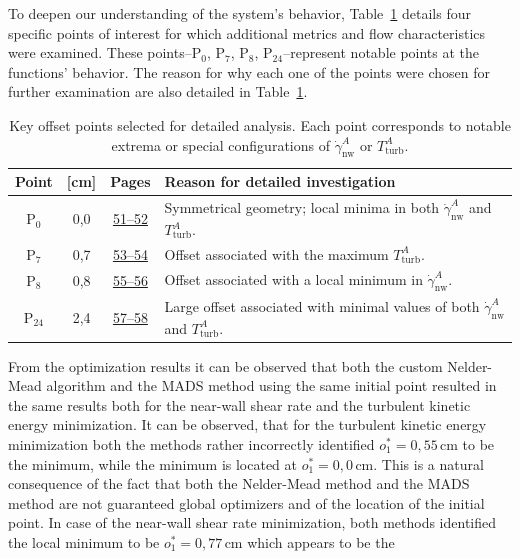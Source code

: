 To deepen our understanding of the system’s behavior, Table~\ref{tab:studied points} details four specific points of interest for which additional metrics and flow characteristics were examined. These points--P$_0$, P$_7$, P$_8$, P$_24$--represent notable points at the functions' behavior. The reason for why each one of the points were chosen for further examination are also detailed in Table~\ref{tab:studied points}.
\vspace{7mm}
\begin{table}[H]
	\bgroup
	\centering
	\setlength\tabcolsep{3mm}
	\def\arraystretch{2.2}%
	\begin{tabular}{|c|c|c|p{8cm}|}
		\hline
		\textbf{Point} & \boldmath{$o_1$} \textbf{[cm]} & \textbf{Pages} & \textbf{Reason for detailed investigation} \\ \hline
		P$_0$ & 0{,}0 & \hyperlink{page.51}{51--52} & Symmetrical geometry; local minima in both $\dot{\gamma}^{A}_{\mathrm{nw}}$ and $T^{A}_{\mathrm{turb}}$. \\ \hline
		P$_7$ & 0{,}7 & \hyperlink{page.53}{53--54} & Offset associated with the maximum $T^{A}_{\mathrm{turb}}$. \\ \hline
		P$_8$ & 0{,}8 & \hyperlink{page.55}{55--56} &  Offset associated with a local minimum in $\dot{\gamma}^{A}_{\mathrm{nw}}$. \\ \hline
		P$_{24}$ & 2{,}4 & \hyperlink{page.57}{57--58} & Large offset associated with minimal values of both $\dot{\gamma}^{A}_{\mathrm{nw}}$ and $T^{A}_{\mathrm{turb}}$. \\ \hline
	\end{tabular}
	 \caption{Key offset points selected for detailed analysis. Each point corresponds to notable extrema or special configurations of $\dot{\gamma}^{A}_{\mathrm{nw}}$ or $T^{A}_{\mathrm{turb}}$.}
	\label{tab:studied points}
	\egroup
\end{table}




From the optimization results it can be observed that both the custom Nelder-Mead algorithm and the MADS method using the same initial point resulted in the same results both for the near-wall shear rate and the turbulent kinetic energy minimization. It can be observed, that for the turbulent kinetic energy minimization both the methods rather incorrectly identified $o^{*}_{1} = 0{,}55 \, \mathrm{cm}$ to be the minimum, while the minimum is located at $o^{*}_{1} = 0{,}0 \, \mathrm{cm}$. This is a natural consequence of the fact that both the Nelder-Mead method and the MADS method are not guaranteed global optimizers and of the location of the initial point. In case of the near-wall shear rate minimization, both methods identified the local minimum to be $o^{*}_{1} = 0{,}77 \, \mathrm{cm}$ which appears to be the 

